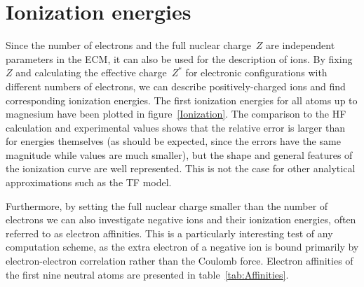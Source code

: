 \section{Ionization energies}

Since the number of electrons and the full nuclear charge~$Z$ are independent parameters in the ECM, it can also be used for the description of ions. By fixing~$Z$ and calculating the effective charge~$Z^*$ for electronic configurations with different numbers of electrons, we can describe positively-charged ions and find corresponding ionization energies. The first ionization energies for all atoms up to magnesium have been plotted in figure~\ref{Ionization}. The comparison to the HF calculation and experimental values shows that the relative error is larger than for energies themselves (as should be expected, since the errors have the same magnitude while values are much smaller), but the shape and general features of the ionization curve are well represented. This is not the case for other analytical approximations such as the TF model.

	Furthermore, by setting the full nuclear charge smaller than the number of electrons we can also investigate negative ions and their ionization energies, often referred to as electron affinities. This is a particularly interesting test of any computation scheme, as the extra electron of a negative ion is bound primarily by electron-electron correlation rather than the Coulomb force. Electron affinities of the first nine neutral atoms are presented in table~\ref{tab:Affinities}.
	
